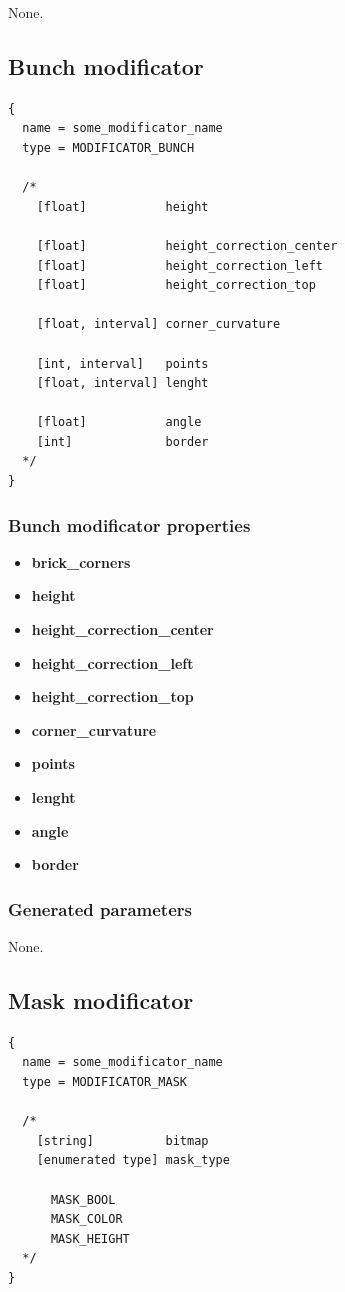 \documentclass[9pt]{article}
\begin{document}
None.

\subsection{Bunch modificator}

\begin{verbatim}
{
  name = some_modificator_name
  type = MODIFICATOR_BUNCH

  /*
    [float]           height
    
    [float]           height_correction_center
    [float]           height_correction_left
    [float]           height_correction_top      
    
    [float, interval] corner_curvature
    
    [int, interval]   points
    [float, interval] lenght
    
    [float]           angle
    [int]             border
  */
}
\end{verbatim}
\subsubsection*{Bunch modificator properties}
\begin{itemize}
\item{\bf brick\_corners}
\item{\bf height}
\item{\bf height\_correction\_center}
\item{\bf height\_correction\_left}
\item{\bf height\_correction\_top}
\item{\bf corner\_curvature}
\item{\bf points}
\item{\bf lenght}
\item{\bf angle}
\item{\bf border}
\end{itemize}

\subsubsection*{Generated parameters}

None.

\subsection{Mask modificator}

\begin{verbatim}
{
  name = some_modificator_name
  type = MODIFICATOR_MASK

  /*
    [string]          bitmap
    [enumerated type] mask_type
  
      MASK_BOOL
      MASK_COLOR
      MASK_HEIGHT
  */
}
\end{verbatim}
\end{document}
